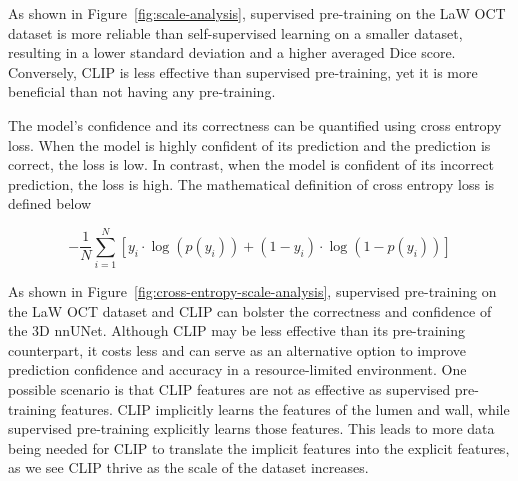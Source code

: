 \documentclass[a4paper,11pt,oneside]{report}
\begin{document}
As shown in Figure~\ref{fig:scale-analysis}, supervised pre-training on the LaW OCT dataset is more reliable than self-supervised learning on a smaller dataset, resulting in a lower standard deviation and a higher averaged Dice score. Conversely, CLIP is less effective than supervised pre-training, yet it is more beneficial than not having any pre-training.

The model's confidence and its correctness can be quantified using cross entropy loss. When the model is highly confident of its prediction and the prediction is correct, the loss is low. In contrast, when the model is confident of its incorrect prediction, the loss is high. The mathematical definition of cross entropy loss is defined below

\begin{equation}
-\frac{1}{N}\sum_{i=1}^{N}\left[y_{i}\cdot\log\left(p(y_{i})\right)+ \left( 1-y_{i} \right)\cdot \log\left(1 - p(y_{i})\right) \right]
\end{equation}

As shown in Figure~\ref{fig:cross-entropy-scale-analysis}, supervised pre-training on the LaW OCT dataset and CLIP can bolster the correctness and confidence of the 3D nnUNet. Although CLIP may be less effective than its pre-training counterpart, it costs less and can serve as an alternative option to improve prediction confidence and accuracy in a resource-limited environment.
One possible scenario is that CLIP features are not as effective as supervised pre-training features. CLIP implicitly learns the features of the lumen and wall, while supervised pre-training explicitly learns those features. This leads to more data being needed for CLIP to translate the implicit features into the explicit features, as we see CLIP thrive as the scale of the dataset increases. 
\end{document}
